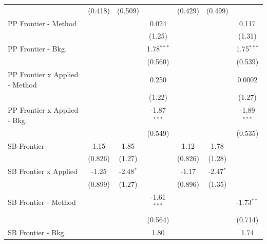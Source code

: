 \begin{tabular}{lcccccc}
                                  & (0.418)        & (0.509)       &               & (0.429)        & (0.499)        &   \\   
   PP Frontier - Method           &                &               & 0.024         &                &                & 0.117\\   
                                  &                &               & (1.25)        &                &                & (1.31)\\   
   PP Frontier - Bkg.             &                &               & 1.78$^{***}$  &                &                & 1.75$^{***}$\\   
                                  &                &               & (0.560)       &                &                & (0.539)\\   
   PP Frontier x Applied - Method &                &               & 0.250         &                &                & 0.0002\\   
                                  &                &               & (1.22)        &                &                & (1.27)\\   
   PP Frontier x Applied - Bkg.   &                &               & -1.87$^{***}$ &                &                & -1.89$^{***}$\\   
                                  &                &               & (0.549)       &                &                & (0.535)\\   
   SB Frontier                    & 1.15           & 1.85          &               & 1.12           & 1.78           &   \\   
                                  & (0.826)        & (1.27)        &               & (0.826)        & (1.28)         &   \\   
   SB Frontier x Applied          & -1.25          & -2.48$^{*}$   &               & -1.17          & -2.47$^{*}$    &   \\   
                                  & (0.899)        & (1.27)        &               & (0.896)        & (1.35)         &   \\   
   SB Frontier - Method           &                &               & -1.61$^{***}$ &                &                & -1.73$^{**}$\\   
                                  &                &               & (0.564)       &                &                & (0.714)\\   
   SB Frontier - Bkg.             &                &               & 1.80          &                &                & 1.74\\   

\end{tabular}
